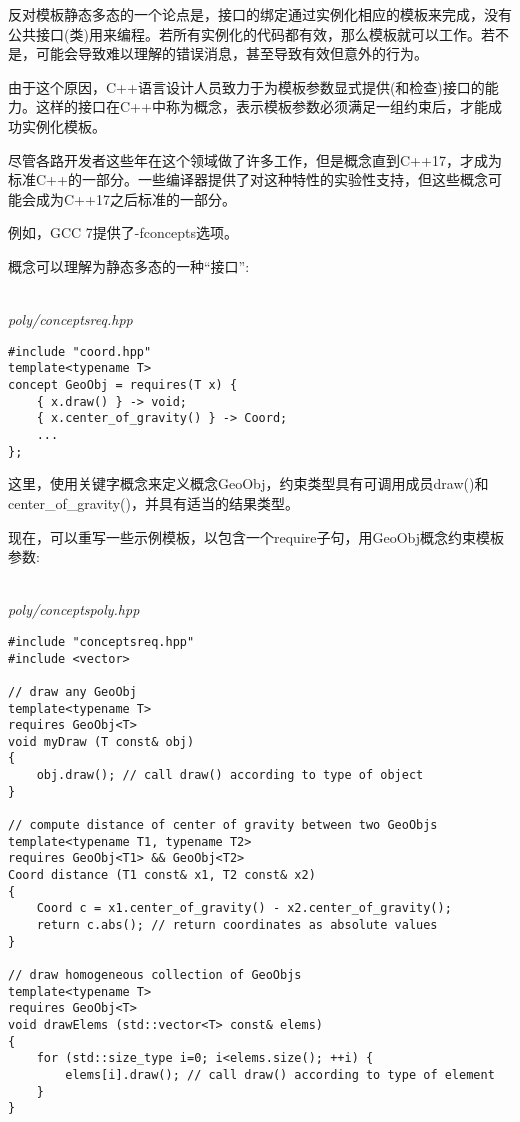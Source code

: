 反对模板静态多态的一个论点是，接口的绑定通过实例化相应的模板来完成，没有公共接口(类)用来编程。若所有实例化的代码都有效，那么模板就可以工作。若不是，可能会导致难以理解的错误消息，甚至导致有效但意外的行为。

由于这个原因，C++语言设计人员致力于为模板参数显式提供(和检查)接口的能力。这样的接口在C++中称为概念，表示模板参数必须满足一组约束后，才能成功实例化模板。

尽管各路开发者这些年在这个领域做了许多工作，但是概念直到C++17，才成为标准C++的一部分。一些编译器提供了对这种特性的实验性支持，但这些概念可能会成为C++17之后标准的一部分。

\begin{tcolorbox}[colback=webgreen!5!white,colframe=webgreen!75!black]
\hspace*{0.75cm}例如，GCC 7提供了-fconcepts选项。
\end{tcolorbox}

概念可以理解为静态多态的一种“接口”:

\hspace*{\fill} \\ %
\noindent
\textit{poly/conceptsreq.hpp}
\begin{lstlisting}[style=styleCXX]
#include "coord.hpp"
template<typename T>
concept GeoObj = requires(T x) {
	{ x.draw() } -> void;
	{ x.center_of_gravity() } -> Coord;
	...
};
\end{lstlisting}

这里，使用关键字概念来定义概念GeoObj，约束类型具有可调用成员draw()和center\_of\_gravity()，并具有适当的结果类型。

现在，可以重写一些示例模板，以包含一个require子句，用GeoObj概念约束模板参数:

\hspace*{\fill} \\ %
\noindent
\textit{poly/conceptspoly.hpp}
\begin{lstlisting}[style=styleCXX]
#include "conceptsreq.hpp"
#include <vector>

// draw any GeoObj
template<typename T>
requires GeoObj<T>
void myDraw (T const& obj)
{
	obj.draw(); // call draw() according to type of object
}

// compute distance of center of gravity between two GeoObjs
template<typename T1, typename T2>
requires GeoObj<T1> && GeoObj<T2>
Coord distance (T1 const& x1, T2 const& x2)
{
	Coord c = x1.center_of_gravity() - x2.center_of_gravity();
	return c.abs(); // return coordinates as absolute values
}

// draw homogeneous collection of GeoObjs
template<typename T>
requires GeoObj<T>
void drawElems (std::vector<T> const& elems)
{
	for (std::size_type i=0; i<elems.size(); ++i) {
		elems[i].draw(); // call draw() according to type of element
	}
}
\end{lstlisting}

